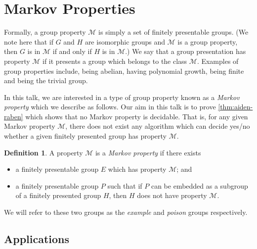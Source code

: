 \documentclass[11pt,a4paper,reqno]{amsart}
\theoremstyle{plain}
\theoremstyle{definition}
\newtheorem{definition}[theorem]{Definition}
\theoremstyle{definition}
\begin{document}
\section{Markov Properties}

Formally, a group property $\mathcal M$ is simply a set of finitely presentable groups.
(We note here that if $G$ and $H$ are isomorphic groups and $\mathcal M$ is a group property, then $G$ is in $\mathcal M$ if and only if $H$ is in $\mathcal M$.)
We say that a group presentation has property $\mathcal M$ if it presents a group which belongs to the class $\mathcal M$.
Examples of group properties include, being abelian, having polynomial growth, being finite and being the trivial group.

In this talk, we are interested in a type of group property known as a \emph{Markov property} which we describe as follows.
Our aim in this talk is to prove \cref{thm:aiden-raben} which shows that no Markov property is decidable.
That is, for any given Markov property $\mathcal M$, there does not exist any algorithm which can decide yes/no whether a given finitely presented group has property $\mathcal M$.

\begin{definition}\label{def:markov-prop}
	A property $\mathcal M$ is a \emph{Markov property} if there exists
	\begin{itemize}
		\item a finitely presentable group $E$ which has property $\mathcal M$; and
		\item a finitely presentable group $P$ such that if $P$ can be embedded as a subgroup of a finitely presented group $H$, then $H$ does not have property $\mathcal M$.
	\end{itemize}
	We will refer to these two groups as the \emph{example} and \emph{poison} groups respectively.
\end{definition}

\subsection{Applications}
\end{document}
